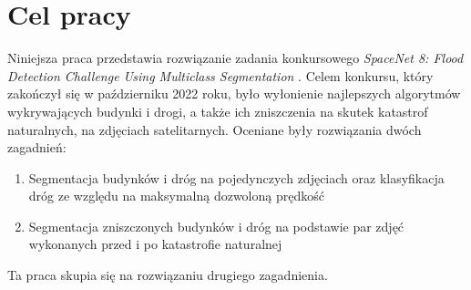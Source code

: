\newpage %
\section{Cel pracy}
Niniejsza praca przedstawia rozwiązanie zadania konkursowego \textit{SpaceNet 8: Flood Detection Challenge Using Multiclass Segmentation} \cite{spacenet8}. Celem konkursu, który zakończył się w październiku 2022 roku, było wyłonienie najlepszych algorytmów wykrywających budynki i drogi, a także ich zniszczenia na skutek katastrof naturalnych, na zdjęciach satelitarnych. Oceniane były rozwiązania dwóch zagadnień:
\begin{enumerate}
\item Segmentacja budynków i dróg na pojedynczych zdjęciach oraz klasyfikacja dróg ze względu na maksymalną dozwoloną prędkość
\item Segmentacja zniszczonych budynków i dróg na podstawie par zdjęć wykonanych przed i po katastrofie naturalnej
\end{enumerate}
Ta praca skupia się na rozwiązaniu drugiego zagadnienia.

